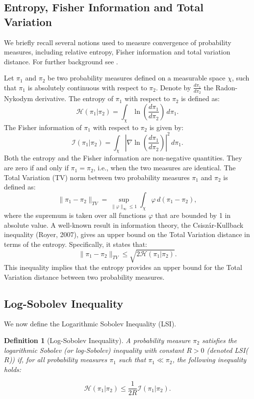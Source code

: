\documentclass[11pt, twoside]{report}
\newtheorem{definition}[theorem]{Definition}
\begin{document}
\subsection{Entropy, Fisher Information and Total Variation} \label{subsec:entropy_fisher}
We briefly recall several notions used to measure convergence of probability measures, including relative entropy, Fisher information and total variation distance. For further background see \cite{bakry2014analysis, pavliotis_book}.

Let $\pi_1$ and $\pi_2$ be two probability measures defined on a measurable space $\chi$, %
such that $\pi_1$ is absolutely continuous with respect to $\pi_2$. Denote by $\frac{d\pi_1}{d\pi_2}$ the Radon-Nykodym derivative. The entropy of $\pi_1$ with respect to $\pi_2$ is defined as:
\[
\mathcal{H}(\pi_1 | \pi_2) = \int_\chi \ln{\left( \frac{d\pi_1}{d\pi_2} \right)} \, d\pi_1.
\]
The Fisher information of $\pi_1$ with respect to $\pi_2$ is given by:
\[
\mathcal{I}(\pi_1 | \pi_2) = \int_\chi \left| \nabla \ln{\left( \frac{d\pi_1}{d\pi_2} \right)} \right|^2 \, d\pi_1.
\]
Both the entropy and the Fisher information are non-negative quantities. They are zero if and only if $\pi_1 = \pi_2$, i.e., when the two measures are identical. The Total Variation (TV) norm between two probability measures $\pi_1$ and $\pi_2$ is defined as:
\[
\|\pi_1 - \pi_2\|_{TV} = \sup_{\|\varphi\|_{\infty} \leq 1} \int_\chi \varphi \, d(\pi_1 - \pi_2),
\]
where the supremum is taken over all functions $\varphi$ that are bounded by 1 in absolute value. A well-known result in information theory, the Csisz\'{a}r-Kullback inequality (Royer, 2007), gives an upper bound on the Total Variation distance in terms of the entropy. Specifically, it states that:
\[
\|\pi_1 - \pi_2\|_{TV} \leq \sqrt{2\mathcal{H}(\pi_1 | \pi_2)}.
\]
This inequality implies that the entropy provides an upper bound for the Total Variation distance between two probability measures.

\subsection{Log-Sobolev Inequality}

We now define the Logarithmic Sobolev Inequality (LSI).
\begin{definition}[Log-Sobolev Inequality]
A probability measure $\pi_2$ satisfies the logarithmic Sobolev (or log-Sobolev) inequality with constant $R > 0$ (denoted LSI($R$)) if, for all probability measures $\pi_1$ such that $\pi_1 \ll \pi_2$, the following inequality holds:

\[
\mathcal{H}(\pi_1 | \pi_2) \leq \frac{1}{2R} \mathcal{I}(\pi_1 | \pi_2).
\]
\end{definition}
\end{document}
